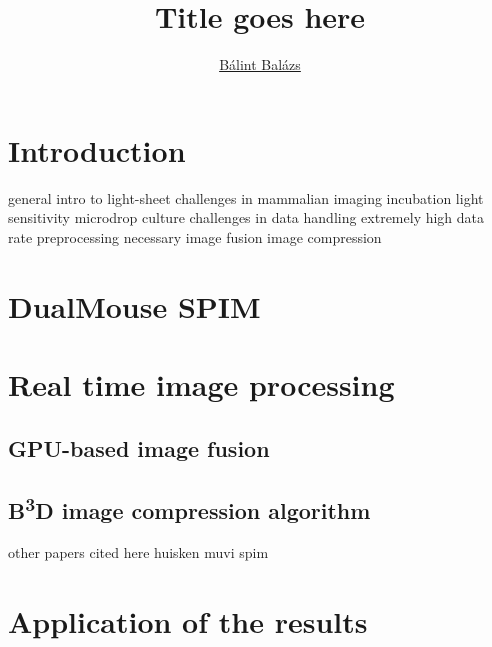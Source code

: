 \documentclass{booklet_style}
\author{\href{mailto:balint.balazs@embl.de}{Bálint Balázs}}
\title{Title goes here}
\def\b3d{B\textsuperscript{3}D}
\begin{document}
\maketitle

\newpage
\setcounter{page}{1}
\section{Introduction}
general intro to light-sheet
challenges in mammalian imaging
    incubation
    light sensitivity
    microdrop culture
challenges in data handling
    extremely high data rate
    preprocessing necessary
        image fusion
        image compression
    

\section{DualMouse SPIM}


\section{Real time image processing}

\subsection*{GPU-based image fusion}

\subsection*{\b3d image compression algorithm}



other papers cited here
huisken \cite{huisken_optical_2004}
muvi spim \cite{krzic_multiview_2012}




\section{Application of the results}




\end{document}
